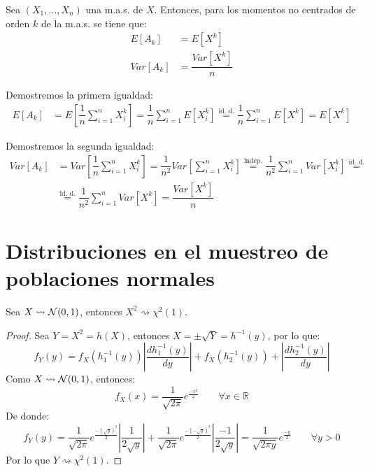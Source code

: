 \begin{ejercicio}
    Sea $(X_1, \ldots, X_n)$ una m.a.s. de $X$. Entonces, para los momentos no centrados de orden $k$ de la m.a.s. se tiene que:
    \begin{align*}
        E\left[A_k\right] &= E[X^k] \\
        Var\left[A_k\right] &= \dfrac{Var[X^k]}{n}
    \end{align*}

    Demostremos la primera igualdad:
    \begin{align*}
        E\left[A_k\right] &= E\left[\dfrac{1}{n}\sum\limits_{i=1}^{n}X_i^k\right] = \dfrac{1}{n}\sum\limits_{i=1}^{n}E[X_i^k]
        \stackrel{\text{id. d.}}{=} \dfrac{1}{n}\sum\limits_{i=1}^{n}E[X^k] = E[X^k]
    \end{align*}

    Demostremos la segunda igualdad:
    \begin{align*}
        Var\left[A_k\right] &= Var\left[\dfrac{1}{n}\sum\limits_{i=1}^{n}X_i^k\right] = \dfrac{1}{n^2}Var\left[\sum\limits_{i=1}^{n}X_i^k\right]
        \stackrel{\text{indep.}}{=} \dfrac{1}{n^2}\sum\limits_{i=1}^{n}Var[X_i^k]
        \stackrel{\text{id. d.}}{=}\\&\stackrel{\text{id. d.}}{=}
        \dfrac{1}{n^2}\sum\limits_{i=1}^{n}Var[X^k] = \dfrac{Var[X^k]}{n}
    \end{align*}
\end{ejercicio}

\section{Distribuciones en el muestreo de poblaciones normales}
\begin{prop}
    Sea $X\rightsquigarrow\mathcal{N}(0,1)$, entonces $X^2\rightsquigarrow \chi^2(1)$.
    \begin{proof}
        Sea $Y = X^2 = h(X)$, entonces $X = \pm \sqrt{Y} = h^{-1}(y)$, por lo que:
        \begin{equation*}
            f_Y(y) = f_X(h_1^{-1}(y)) \left|\dfrac{dh_1^{-1}(y)}{dy}\right| + f_X(h_2^{-1}(y)) + \left|\dfrac{dh_2^{-1}(y)}{dy}\right| 
        \end{equation*}
        Como $X\rightsquigarrow \mathcal{N}(0,1)$, entonces:
        \begin{equation*}
            f_X(x) = \dfrac{1}{\sqrt{2\pi}} e^{\frac{-x^2}{2}} \qquad \forall x\in \mathbb{R}
        \end{equation*}
        De donde:
        \begin{equation*}
            f_Y(y) = \dfrac{1}{\sqrt{2\pi}} e^{\frac{-{(\sqrt{y})}^{2}}{2}} \left|\dfrac{1}{2\sqrt{y}}\right| + \dfrac{1}{\sqrt{2\pi}} e^{\frac{-{(-\sqrt{y})}^{2}}{2}} \left|\dfrac{-1}{2\sqrt{y}}\right|  = \dfrac{1}{\sqrt{2\pi y}} e^{\frac{-y}{2}} \qquad \forall y>0
        \end{equation*}
        Por lo que $Y\rightsquigarrow\chi^2(1)$.
    \end{proof}
\end{prop}

